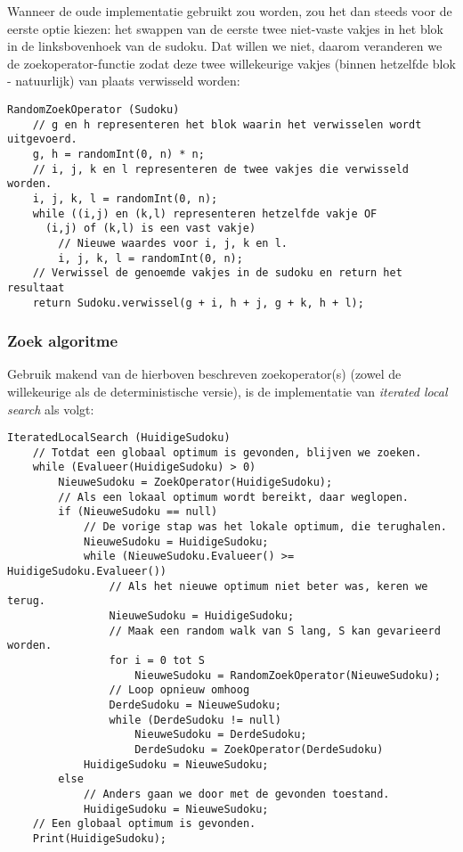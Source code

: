 \documentclass[]{report}
\begin{document}
Wanneer de oude implementatie gebruikt zou worden, zou het dan steeds voor de eerste optie kiezen: het swappen van de eerste twee niet-vaste vakjes in het blok in de linksbovenhoek van de sudoku. Dat willen we niet, daarom veranderen we de zoekoperator-functie zodat deze twee willekeurige vakjes (binnen hetzelfde blok - natuurlijk) van plaats verwisseld worden:

\begin{minipage}{\textwidth}
\begin{lstlisting}
RandomZoekOperator (Sudoku)
	// g en h representeren het blok waarin het verwisselen wordt uitgevoerd.
	g, h = randomInt(0, n) * n;
	// i, j, k en l representeren de twee vakjes die verwisseld worden.
	i, j, k, l = randomInt(0, n);
	while ((i,j) en (k,l) representeren hetzelfde vakje OF
	  (i,j) of (k,l) is een vast vakje)
		// Nieuwe waardes voor i, j, k en l.
		i, j, k, l = randomInt(0, n);
	// Verwissel de genoemde vakjes in de sudoku en return het resultaat
	return Sudoku.verwissel(g + i, h + j, g + k, h + l);
\end{lstlisting}
\end{minipage}

\subsubsection{Zoek algoritme}
Gebruik makend van de hierboven beschreven zoekoperator(s) (zowel de willekeurige als de deterministische versie), is de implementatie van \textit{iterated local search} als volgt:

\begin{minipage}{\textwidth}
\begin{lstlisting}
IteratedLocalSearch (HuidigeSudoku)
	// Totdat een globaal optimum is gevonden, blijven we zoeken.
	while (Evalueer(HuidigeSudoku) > 0)
		NieuweSudoku = ZoekOperator(HuidigeSudoku);
		// Als een lokaal optimum wordt bereikt, daar weglopen.
		if (NieuweSudoku == null)
			// De vorige stap was het lokale optimum, die terughalen.
			NieuweSudoku = HuidigeSudoku;
			while (NieuweSudoku.Evalueer() >= HuidigeSudoku.Evalueer())
				// Als het nieuwe optimum niet beter was, keren we terug.
				NieuweSudoku = HuidigeSudoku; 
				// Maak een random walk van S lang, S kan gevarieerd worden.
				for i = 0 tot S
					NieuweSudoku = RandomZoekOperator(NieuweSudoku);
				// Loop opnieuw omhoog
				DerdeSudoku = NieuweSudoku; 
				while (DerdeSudoku != null)
					NieuweSudoku = DerdeSudoku;
					DerdeSudoku = ZoekOperator(DerdeSudoku)
			HuidigeSudoku = NieuweSudoku;
		else 
			// Anders gaan we door met de gevonden toestand.
			HuidigeSudoku = NieuweSudoku;
	// Een globaal optimum is gevonden.
	Print(HuidigeSudoku);
\end{lstlisting}
\end{minipage}
\end{document}
